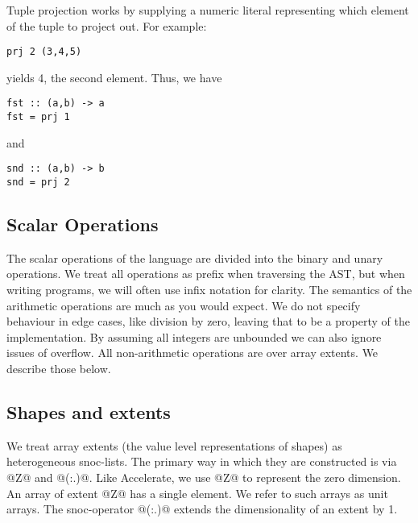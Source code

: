 
Tuple projection works by supplying a numeric literal representing which element of the tuple to project out. For example:
%
\begin{lstlisting}
prj 2 (3,4,5)
\end{lstlisting}
%
yields 4, the second element. Thus, we have
%
\begin{lstlisting}
fst :: (a,b) -> a
fst = prj 1
\end{lstlisting}
%
and
%
\begin{lstlisting}
snd :: (a,b) -> b
snd = prj 2
\end{lstlisting}

\subsection{Scalar Operations}
The scalar operations of the language are divided into the binary and unary operations. We treat all operations as prefix when traversing the AST, but when writing programs, we will often use infix notation for clarity. The semantics of the arithmetic operations are much as you would expect. We do not specify behaviour in edge cases, like division by zero, leaving that to be a property of the implementation. By assuming all integers are unbounded we can also ignore issues of overflow. All non-arithmetic operations are over array extents. We describe those below.

\subsection{Shapes and extents}
We treat array extents (the value level representations of shapes) as heterogeneous snoc-lists. The primary way in which they are constructed is via @Z@ and @(:.)@. Like Accelerate, we use @Z@ to represent the zero dimension. An array of extent @Z@ has a single element. We refer to such arrays as unit arrays. The snoc-operator @(:.)@ extends the dimensionality of an extent by 1.

